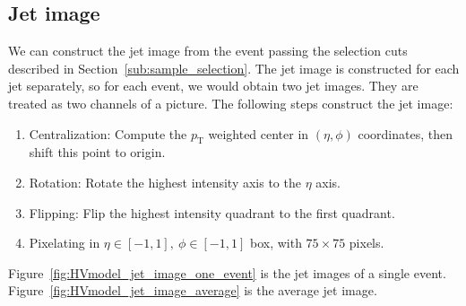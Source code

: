 \documentclass[12pt]{article}
\begin{document}
	\subsection{Jet image}%
	\label{sub:jet_image}
		We can construct the jet image from the event passing the selection cuts described in Section~\ref{sub:sample_selection}. The jet image is constructed for each jet separately, so for each event, we would obtain two jet images. They are treated as two channels of a picture. The following steps construct the jet image:
		\begin{enumerate}
			\item Centralization: Compute the $p_{\text{T}}$ weighted center in $\left( \eta,\phi \right) $ coordinates, then shift this point to origin.
			\item Rotation: Rotate the highest intensity axis to the $\eta$ axis.
			\item Flipping:	Flip the highest intensity quadrant to the first quadrant.
			\item Pixelating in $\eta \in [-1,1],\ \phi \in [-1,1]$ box, with $75\times 75$ pixels.
		\end{enumerate}

		Figure~\ref{fig:HVmodel_jet_image_one_event} is the jet images of a single event. Figure~\ref{fig:HVmodel_jet_image_average} is the average jet image. 
\end{document}
